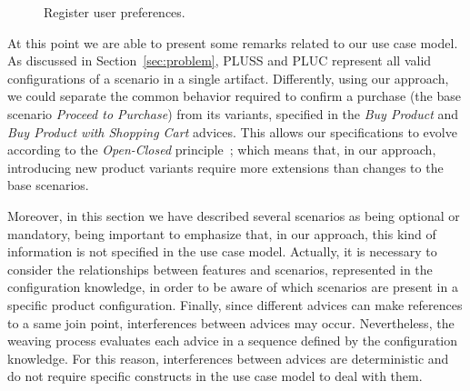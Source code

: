 \documentclass{sig-alternate}
\begin{document}
\begin{figure}[h]
\caption{Register user preferences.}
\label{fig:register-preferences-flow}
\end{figure}

At this point we are able to present some remarks related to our use
case model. As discussed in Section~\ref{sec:problem}, PLUSS and PLUC represent
all valid configurations of a scenario in a single artifact. Differently, using
our approach, we could separate the common behavior required to confirm a
purchase (the base scenario \emph{Proceed to Purchase}) from its variants,
specified in the \emph{Buy Product} and \emph{Buy Product with Shopping Cart}
advices. This allows our specifications to evolve according to the
\emph{Open-Closed} principle~\cite{Meyer:2000aa}; which means that, in our
approach, introducing new product variants require more extensions than changes
to the base scenarios.

Moreover, in this section we have described several
scenarios as being optional or mandatory, being important to emphasize
that, in our approach, this kind of information is not specified in the use case
model. Actually, it is necessary to consider the relationships between features
and scenarios, represented in the configuration knowledge, in order to be aware
of which scenarios are present in a specific product configuration. Finally,
since different advices can make references to a same join point,  interferences
between advices may occur. Nevertheless, the weaving process evaluates each advice in
a sequence defined by the configuration knowledge. For this reason, interferences
between advices are deterministic and do not require specific constructs in the
use case model to deal with them.
\end{document}
